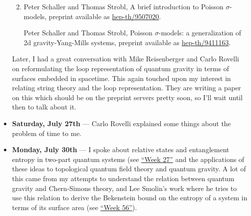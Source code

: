 \documentclass{article}
\begin{document}
\begin{itemize}
  \begin{enumerate}
  \def\labelenumi{\arabic{enumi})}
  \setcounter{enumi}{2}
  \item
    Peter Schaller and Thomas Strobl, A brief introduction to Poisson
    \(\sigma\)-models, preprint available as
    \href{https://arxiv.org/abs/hep-th/9507020}{hep-th/9507020}.

    Peter Schaller and Thomas Strobl, Poisson \(\sigma\)-models: a
    generalization of 2d gravity-Yang-Mills systems, preprint available
    as \href{https://arxiv.org/abs/hep-th/9411163}{hep-th/9411163}.
  \end{enumerate}

  Later, I had a great conversation with Mike Reisenberger and Carlo
  Rovelli on reformulating the loop representation of quantum gravity in
  terms of surfaces embedded in spacetime. This again touched upon my
  interest in relating string theory and the loop representation. They
  are writing a paper on this which should be on the preprint servers
  pretty soon, so I'll wait until then to talk about it.
\item
  \textbf{Saturday, July 27th} --- Carlo Rovelli explained some things
  about the problem of time to me.
\item
  \textbf{Monday, July 30th} --- I spoke about relative states and
  entanglement entropy in two-part quantum systems (see
  \protect\hyperlink{week27}{``Week 27''} and the applications of these
  ideas to topological quantum field theory and quantum gravity. A lot
  of this came from my attempts to understand the relation between
  quantum gravity and Chern-Simons theory, and Lee Smolin's work where
  he tries to use this relation to derive the Bekenstein bound on the
  entropy of a system in terms of its surface area (see
  \protect\hyperlink{week56}{``Week 56''}).


\end{itemize}
\end{document}
